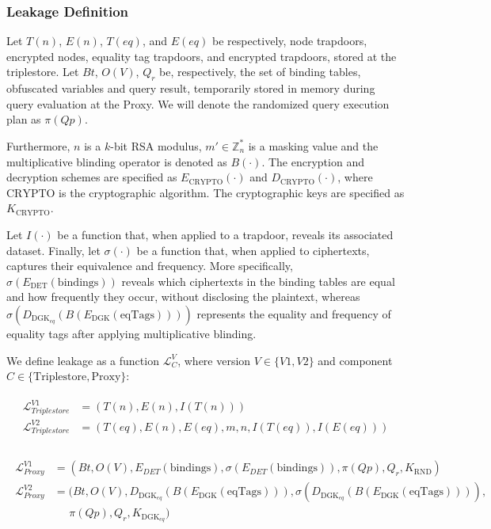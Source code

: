 \subsubsection{Leakage Definition}

Let $T(n)$, $E(n)$, $T(eq)$, and $E(eq)$ be respectively, node trapdoors, encrypted nodes, equality tag trapdoors, and encrypted trapdoors, stored at the triplestore. Let $Bt$, $O(V)$, $Q_r$ be, respectively, the set of binding tables, obfuscated variables and query result, temporarily stored in memory during query evaluation at the Proxy. We will denote the randomized query execution plan as $\pi(Qp)$. 

Furthermore, $n$ is a $k$-bit \gls{RSA} modulus, $m' \in \mathbb{Z}^*_n$ is a masking value and the multiplicative blinding operator is denoted as $B(\cdot)$. The encryption and decryption schemes are specified as $E_{\text{CRYPTO}}(\cdot)$ and $D_{\text{CRYPTO}}(\cdot)$, where $\text{CRYPTO}$ is the cryptographic algorithm. The cryptographic keys are specified as $K_{\text{CRYPTO}}$. 

Let $I(\cdot)$ be a function that, when applied to a trapdoor, reveals its associated dataset. Finally, let $\sigma(\cdot)$ be a function that, when applied to ciphertexts, captures their equivalence and frequency. More specifically, $\sigma(E_{\text{DET}}(\mathrm{bindings}))$ reveals which ciphertexts in the binding tables are equal and how frequently they occur, without disclosing the plaintext, whereas $\sigma(D_{\text{DGK}_{eq}}(B(E_{\text{DGK}}(\mathrm{eqTags}))))$ represents the equality and frequency of equality tags after applying multiplicative blinding.

We define leakage as a function $\mathcal{L}_{C}^{V}$, where version $V \in \{V1,V2\}$ and component $C \in \{\mathrm{Triplestore}, \mathrm{Proxy}\}$:

\begin{align}
    \label{equation:leakage-functions-triplestores}
    \begin{split}
        \mathcal{L}_{Triplestore}^{V1} &= ( T(n), E(n), I(T(n))) \\
        \mathcal{L}_{Triplestore}^{V2} &= ( T(eq), E(n), E(eq), m, n, I(T(eq)), I(E(eq))) \\
    \end{split}
\end{align}

\begin{align}
    \label{equation:leakage-functions-proxy}
    \begin{split}
        \mathcal{L}_{Proxy}^{V1} &= (Bt, O(V), E_{DET}(\mathrm{bindings}), \sigma(E_{DET}(\mathrm{bindings})), \pi(Qp), Q_r, K_{\text{RND}}) \\
        \mathcal{L}_{Proxy}^{V2} &= (Bt, O(V), D_{\text{DGK}_{eq}}(B(E_{\text{DGK}}(\mathrm{eqTags}))), \sigma(D_{\text{DGK}_{eq}}(B(E_{\text{DGK}}(\mathrm{eqTags})))), \\ &\;\;\;\;\;\pi(Qp), Q_r, K_{\text{DGK}_{eq}}) \\
    \end{split}
\end{align}

